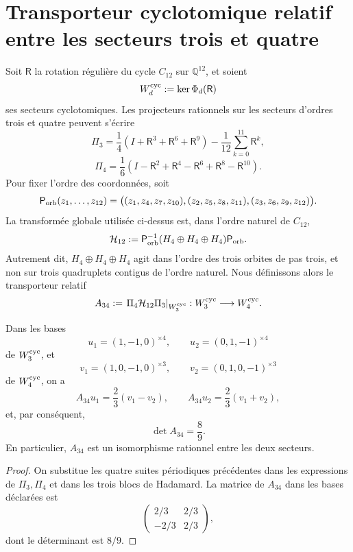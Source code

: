 \section{Transporteur cyclotomique relatif entre les secteurs trois et quatre}
\label{sec:transportador-ciclotomico-a34-rev8}

Soit \(\mathsf R\) la rotation régulière du cycle \(C_{12}\) sur
\(\mathbb Q^{12}\), et soient
\[
 W_d^{\rm cyc}:=\ker\Phi_d(\mathsf R)
\]
ses secteurs cyclotomiques. Les projecteurs rationnels sur les secteurs
d'ordres trois et quatre peuvent s'écrire
\[
 \Pi_3=
 \frac14(I+\mathsf R^3+\mathsf R^6+\mathsf R^9)
 -\frac1{12}\sum_{k=0}^{11}\mathsf R^k,
\]
\[
 \Pi_4=
 \frac16(I-\mathsf R^2+\mathsf R^4-\mathsf R^6
              +\mathsf R^8-\mathsf R^{10}).
\]
Pour fixer l'ordre des coordonnées, soit
\[
 \mathsf P_{\rm orb}(z_1,\ldots,z_{12})
 =\bigl((z_1,z_4,z_7,z_{10}),
        (z_2,z_5,z_8,z_{11}),
        (z_3,z_6,z_9,z_{12})\bigr).
\]
La transformée globale utilisée ci-dessus est, dans l'ordre naturel de \(C_{12}\),
\[
 \mathcal H_{12}
 :=\mathsf P_{\rm orb}^{-1}
   (H_4\oplus H_4\oplus H_4)\mathsf P_{\rm orb}.
\]
Autrement dit, \(H_4\oplus H_4\oplus H_4\) agit dans l'ordre des trois
orbites de pas trois, et non sur trois quadruplets contigus de l'ordre naturel.
Nous définissons alors le transporteur relatif
\[
 A_{34}:=\left.\Pi_4\mathcal H_{12}\Pi_3
          \right|_{W_3^{\rm cyc}}:
 W_3^{\rm cyc}\longrightarrow W_4^{\rm cyc}.
\]

\begin{theorem}
\label{thm:transportador-ciclotomico-a34-rev8}
Dans les bases
\[
 u_1=(1,-1,0)^{\times4},\qquad
 u_2=(0,1,-1)^{\times4}
\]
de \(W_3^{\rm cyc}\), et
\[
 v_1=(1,0,-1,0)^{\times3},\qquad
 v_2=(0,1,0,-1)^{\times3}
\]
de \(W_4^{\rm cyc}\), on a
\[
 A_{34}u_1=\frac23(v_1-v_2),\qquad
 A_{34}u_2=\frac23(v_1+v_2),
\]
et, par conséquent,
\[
 \boxed{\det A_{34}=\frac89}.
\]
En particulier, \(A_{34}\) est un isomorphisme rationnel entre les deux secteurs.
\end{theorem}

\begin{proof}
On substitue les quatre suites périodiques précédentes dans les expressions
de \(\Pi_3,\Pi_4\) et dans les trois blocs de Hadamard. La matrice de \(A_{34}\)
dans les bases déclarées est
\[
 \begin{pmatrix}
  2/3&2/3\\
 -2/3&2/3
 \end{pmatrix},
\]
dont le déterminant est \(8/9\).
\end{proof}

